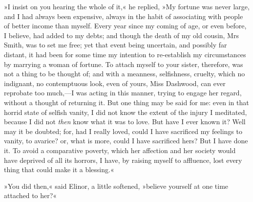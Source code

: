 »I insist on you hearing the whole of it,« he replied, »My fortune was never large, and I had always been expensive, always in the habit of associating with people of better income than myself. Every year since my coming of age, or even before, I believe, had added to my debts; and though the death of my old cousin, Mrs Smith, was to set me free; yet that event being uncertain, and possibly far distant, it had been for some time my intention to re-establish my circumstances by marrying a woman of fortune. To attach myself to your sister, therefore, was not a thing to be thought of; and with a meanness, selfishness, cruelty, which no indignant, no contemptuous look, even of yours, Miss Dashwood, can ever reprobate too much,—I was acting in this manner, trying to engage her regard, without a thought of returning it. But one thing may be said for me: even in that horrid state of selfish vanity, I did not know the extent of the injury I meditated, because I did not \textit{then} know what it was to love. But have I ever known it? Well may it be doubted; for, had I really loved, could I have sacrificed my feelings to vanity, to avarice? or, what is more, could I have sacrificed hers? But I have done it. To avoid a comparative poverty, which her affection and her society would have deprived of all its horrors, I have, by raising myself to affluence, lost every thing that could make it a blessing.«

»You did then,« said Elinor, a little softened, »believe yourself at one time attached to her?«

